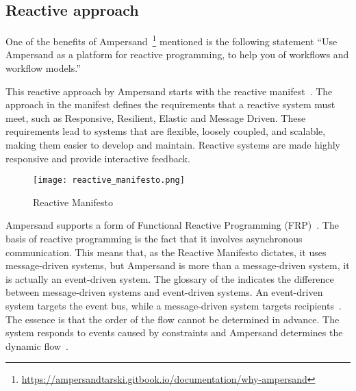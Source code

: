 \subsection{Reactive approach} \label{reactive_approach}
One of the benefits of Ampersand~\footnote{\url{https://ampersandtarski.gitbook.io/documentation/why-ampersand}} mentioned is the following statement ``Use Ampersand as a platform for reactive programming, to help you of workflows and workflow models.''

This reactive approach by Ampersand starts with the reactive manifest~.
The approach in the manifest defines the requirements that a reactive system must meet, such as Responsive, Resilient, Elastic and Message Driven.
These requirements lead to systems that are flexible, loosely coupled, and scalable, making them easier to develop and maintain.
Reactive systems are made highly responsive and provide interactive feedback.
\begin{figure}[H] 
    \texttt{[image: reactive\_manifesto.png]}
    \centering
    \caption{Reactive Manifesto}
    \label{fig:reactive manifesto}
\end{figure}

Ampersand supports a form of Functional Reactive Programming (FRP)~\citep{elliott_functional_1997}.
The basis of reactive programming is the fact that it involves asynchronous communication.
This means that, as the Reactive Manifesto dictates, it uses message-driven systems, but Ampersand is more than a message-driven system, it is actually an event-driven system.
The glossary of the  indicates the difference between message-driven systems and event-driven systems.
An event-driven system targets the event bus, while a message-driven system targets recipients~\citep{bainomugisha_survey_2013}.
The essence is that the order of the flow cannot be determined in advance.
The system responds to events caused by constraints and Ampersand determines the dynamic flow~\citep{joosten_relation_2018}.
